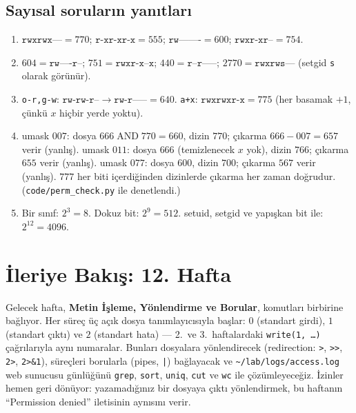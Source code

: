 \documentclass[11pt,a4paper]{article}
\newcommand{\cmd}[1]{\texttt{#1}}
\begin{document}
\subsection*{Sayısal soruların yanıtları}
\begin{enumerate}[leftmargin=1.6em,start=9]
  \item $\texttt{rwxrwx---} = 770$; $\texttt{r-xr-xr-x} = 555$; $\texttt{rw-------} = 600$; $\texttt{rwxr-xr--} = 754$.
  \item $604 = \texttt{rw----r--}$; $751 = \texttt{rwxr-x--x}$; $440 = \texttt{r--r-----}$; $2770 = \texttt{rwxrws---}$ (setgid \texttt{s} olarak görünür).
  \item \texttt{o-r,g-w}: $\texttt{rw-rw-r--} \to \texttt{rw-r-----} = 640$. \texttt{a+x}: $\texttt{rwxrwxr-x} = 775$ (her basamak $+1$, çünkü $x$ hiçbir yerde yoktu).
  \item umask $007$: dosya $666 \mathbin{\text{AND}} 770 = 660$, dizin $770$; çıkarma $666-007 = 657$ verir (yanlış). umask $011$: dosya $666$ (temizlenecek $x$ yok), dizin $766$; çıkarma $655$ verir (yanlış). umask $077$: dosya $600$, dizin $700$; çıkarma $567$ verir (yanlış). $777$ her biti içerdiğinden dizinlerde çıkarma her zaman doğrudur. (\cmd{code/perm\_check.py} ile denetlendi.)
  \item Bir sınıf: $2^3 = 8$. Dokuz bit: $2^9 = 512$. setuid, setgid ve yapışkan bit ile: $2^{12} = 4096$.
\end{enumerate}

\section{İleriye Bakış: 12. Hafta}

Gelecek hafta, \textbf{Metin İşleme, Yönlendirme ve Borular}, komutları birbirine bağlıyor. Her süreç üç açık dosya tanımlayıcısıyla başlar: $0$ (standart girdi), $1$ (standart çıktı) ve $2$ (standart hata) --- 2.\ ve 3.~haftalardaki \cmd{write(1, \dots)} çağrılarıyla aynı numaralar. Bunları dosyalara yönlendirecek (redirection: \texttt{>}, \texttt{>>}, \texttt{2>}, \texttt{2>\&1}), süreçleri borularla (pipes, \texttt{|}) bağlayacak ve \texttt{\textasciitilde/lab/logs/access.log} web sunucusu günlüğünü \cmd{grep}, \cmd{sort}, \cmd{uniq}, \cmd{cut} ve \cmd{wc} ile çözümleyeceğiz. İzinler hemen geri dönüyor: yazamadığınız bir dosyaya çıktı yönlendirmek, bu haftanın ``Permission denied'' iletisinin aynısını verir.
\end{document}
